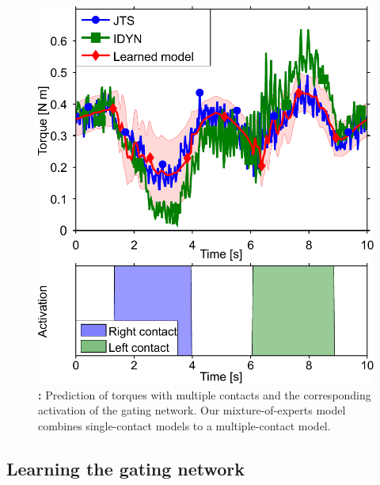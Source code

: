 \begin{figure}[t]
\begin{minipage}{.52\linewidth}
			\includegraphics[width=.99\linewidth]{robertoICRA/fig/exp3_both}
			\caption{\textbf{:} Prediction of torques with multiple contacts and the corresponding activation of the gating network.
			Our mixture-of-experts model combines single-contact models to a multiple-contact model.
			}
			\label{fig:exp3:gating}
		\end{minipage}	
        \figspace
	\end{figure}



\subsection{Learning the gating network}
\label{sec:results:exp5}

